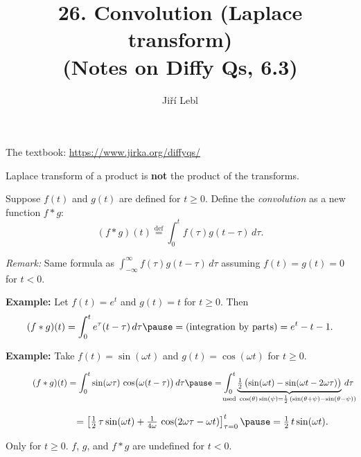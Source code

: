 \documentclass[10pt,aspectratio=169]{beamer}
\author{Ji\v{r}\'i Lebl}
\institute[OSU]{%
Oklahoma State University%
}
\title{26. Convolution (Laplace transform)\\(Notes on Diffy Qs, 6.3)}
\date{}
\begin{document}
\begin{frame}
\titlepage


\begin{center}
The textbook: \url{https://www.jirka.org/diffyqs/}
\end{center}
\end{frame}

\begin{frame}
Laplace transform of a product is \textbf{not} the product of the transforms.

\medskip
\pause

Suppose $f(t)$ and $g(t)$ are defined for $t \geq 0$.  Define
the \emph{convolution} as a new function $f * g$:
\[
(f * g)(t) \overset{\text{def}}{=}
\int_0^t f(\tau) g(t-\tau) \, d\tau .
\]

\pause

\emph{Remark:}  Same formula as
$\int_{-\infty}^\infty f(\tau) g(t-\tau) \, d\tau$
assuming $f(t)=g(t)=0$ for $t < 0$.

\medskip
\pause

\textbf{Example:}
Let $f(t) = e^t$ and $g(t) = t$ for $t \geq 0$.  Then 
\[
(f*g)(t)
=
\int_0^t e^\tau (t-\tau) \, d\tau
\pause
=
\text{(integration by parts)}
=
e^t - t - 1 .
\]

\pause

\textbf{Example:}
Take $f(t) = \sin (\omega t)$ and $g(t) = \cos (\omega t)$ for $t \geq 0$.

\smallskip

$\displaystyle
\quad\qquad
(f*g)(t)
=
\int_0^t  \sin ( \omega \tau ) \,
\cos \bigl( \omega (t-\tau) \bigr) \, d\tau
\pause
=
\int_0^t
\underbrace{
\tfrac{1}{2} \, \bigl( \sin (\omega t) - \sin (\omega t - 2 \omega \tau
) \bigr)
}_{\mathclap{\text{used } \cos (\theta) \sin (\psi) =
\frac{1}{2} \, \left( \sin (\theta + \psi) - \sin (\theta - \psi) \right)}}
\, d\tau
$

\medskip
\pause

$\displaystyle
\quad\qquad
\phantom{(f*g)(t)}
{} =
\left[ \tfrac{1}{2} \, \tau  \sin (\omega t) + \tfrac{1}{4\omega} \, \cos (2 \omega \tau -
\omega t) \right]_{\tau=0}^t
\pause
= \tfrac{1}{2} \, t \sin (\omega t) .
$

\medskip
\pause

Only for $t \geq 0$. \quad  $f$, $g$, and $f*g$ are undefined for $t < 0$.

\end{frame}
\end{document}

